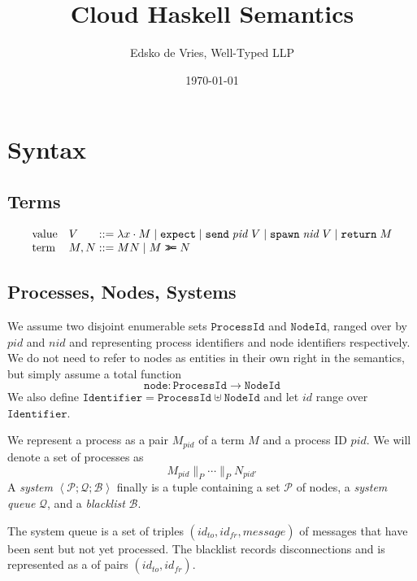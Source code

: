 \documentclass{article}
\newcommand{\sLam}[2]{\lambda {#1} \cdot {#2}}
\newcommand{\sApp}[2]{{#1} {#2}}
\newcommand{\sBind}[2]{{#1} \mathrel{\texttt{>}\!\!\texttt{>}\!\texttt{=}} {#2}}
\newcommand{\sReturn}{\mathtt{return}}
\newcommand{\sExpect}{\mathtt{expect}}
\newcommand{\sSend}{\mathtt{send}}
\newcommand{\sSpawn}{\mathtt{spawn}}
\newcommand{\sPar}{\mathrel{{\parallel}_P}}
\newcommand{\sProc}[2]{{#1}_{#2}}
\newcommand{\sPid}{\ensuremath{\mathit{pid}}}
\newcommand{\sNid}{\ensuremath{\mathit{nid}}}
\newcommand{\sId}{\ensuremath{\mathit{id}}}
\newcommand{\sSystem}[3]{\left\langle #1 ; #2 ; #3 \right\rangle}
\newcommand{\sQueue}{\mathcal{Q}}
\newcommand{\sProcesses}{\mathcal{P}}
\newcommand{\sBlacklist}{\mathcal{B}}
\newcommand{\OR}{\mathrel{|}}
\begin{document}
\title{Cloud Haskell Semantics}
\author{Edsko de Vries, Well-Typed LLP}
\date{\today}

\maketitle

\section{Syntax}

\subsection{Terms}

\begin{equation*}
\begin{array}{ll@{\;::=\;}l}
\text{value} & V    & \sLam{x}{M} \OR
                      \sExpect \OR
                      \sSend \; \sPid \; V \OR
                      \sSpawn \; \sNid \; V \OR 
                      \sReturn \; M
\\
\text{term}  & M, N & \sApp{M}{N} \OR
                      \sBind{M}{N}
\end{array}
\end{equation*}

\subsection{Processes, Nodes, Systems}

We assume two disjoint enumerable sets $\mathtt{ProcessId}$ and
$\mathtt{NodeId}$, ranged over by $\sPid$ and $\sNid$ and representing process
identifiers and node identifiers respectively. We do not need to refer to nodes
as entities in their own right in the semantics, but simply assume a total
function $$\mathtt{node} : \mathtt{ProcessId} \rightarrow \mathtt{NodeId}$$ We
also define $\mathtt{Identifier} = \mathtt{ProcessId} \uplus \mathtt{NodeId}$
and let $\sId$ range over $\mathtt{Identifier}$. 

We represent a process as a pair $\sProc{M}{\sPid}$ of a term $M$ and a process
ID $\sPid$. We will denote a set of processes as
%
  $$\sProc{M}{\sPid} \sPar \cdots \sPar \sProc{N}{\sPid'}$$
%
A \emph{system} 
  $\sSystem{\sProcesses}{\sQueue}{\sBlacklist}$ 
finally is a tuple containing a set $\sProcesses$ of nodes,
a \emph{system queue} $\sQueue$, and a \emph{blacklist} $\sBlacklist$.

The system queue is a set of triples $(\sId_\mathit{to}, \sId_\mathit{fr},
\mathit{message})$ of messages that have been sent but not yet processed. The
blacklist records disconnections and is represented as a of pairs
$(\sId_\mathit{to}, \sId_\mathit{fr})$. 
\end{document}
